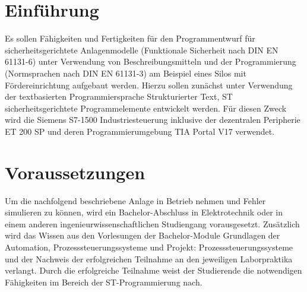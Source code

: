 \documentclass[
	pagesize,
	fontsize=12pt,
	paper=a4,
	oneside,
   reqno
]{scrartcl}
\begin{document}
\clearpage

\renewcommand{\contentsname}{Inhaltsverzeichnis}
\tableofcontents
\clearpage





\section{Einführung}

Es sollen Fähigkeiten und Fertigkeiten für den Programmentwurf für sicherheitsgerichtete Anlagenmodelle (Funktionale Sicherheit nach DIN EN 61131-6) unter Verwendung von Beschreibungsmitteln und der Programmierung (Normsprachen nach DIN EN 61131-3) am Beispiel eines Silos mit Fördereinrichtung aufgebaut werden. Hierzu sollen zunächst unter Verwendung der textbasierten Programmiersprache \glqq Strukturierter Text, ST\grqq{} sicherheitsgerichtete Programmelemente entwickelt werden. Für diesen Zweck wird die Siemens S7-1500 Industriesteuerung inklusive der dezentralen Peripherie ET 200 SP und deren Programmierumgebung TIA Portal V17 verwendet.

\section{Voraussetzungen}

Um die nachfolgend beschriebene Anlage in Betrieb nehmen und Fehler simulieren zu können, wird ein Bachelor-Abschluss in Elektrotechnik oder in einem anderen ingenieurwissenschaftlichen Studiengang vorausgesetzt. Zusätzlich wird das Wissen aus den Vorlesungen der Bachelor-Module \glqq Grundlagen der Automation\grqq{}, \glqq Prozesssteuerungssysteme\grqq{} und \glqq Projekt: Prozesssteuerungssysteme\grqq{} und der Nachweis der erfolgreichen Teilnahme an den jeweiligen Laborpraktika verlangt. Durch die erfolgreiche Teilnahme weist der Studierende die notwendigen Fähigkeiten im Bereich der ST-Programmierung nach.
\end{document}
